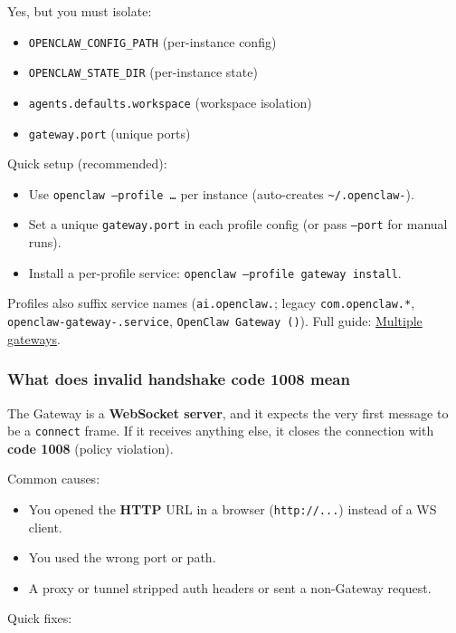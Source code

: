 Yes, but you must isolate:

\begin{itemize}
  \item \texttt{OPENCLAW\_CONFIG\_PATH} (per-instance config)
  \item \texttt{OPENCLAW\_STATE\_DIR} (per-instance state)
  \item \texttt{agents.defaults.workspace} (workspace isolation)
  \item \texttt{gateway.port} (unique ports)
\end{itemize}


Quick setup (recommended):

\begin{itemize}
  \item Use \texttt{openclaw --profile  …} per instance (auto-creates \texttt{\textasciitilde{}/.openclaw-}).
  \item Set a unique \texttt{gateway.port} in each profile config (or pass \texttt{--port} for manual runs).
  \item Install a per-profile service: \texttt{openclaw --profile  gateway install}.
\end{itemize}


Profiles also suffix service names (\texttt{ai.openclaw.}; legacy \texttt{com.openclaw.*}, \texttt{openclaw-gateway-.service}, \texttt{OpenClaw Gateway ()}).
Full guide: \href{/gateway/multiple-gateways}{Multiple gateways}.

\subsubsection{What does invalid handshake code 1008 mean}


The Gateway is a \textbf{WebSocket server}, and it expects the very first message to
be a \texttt{connect} frame. If it receives anything else, it closes the connection
with \textbf{code 1008} (policy violation).

Common causes:

\begin{itemize}
  \item You opened the \textbf{HTTP} URL in a browser (\texttt{http://...}) instead of a WS client.
  \item You used the wrong port or path.
  \item A proxy or tunnel stripped auth headers or sent a non-Gateway request.
\end{itemize}


Quick fixes:

